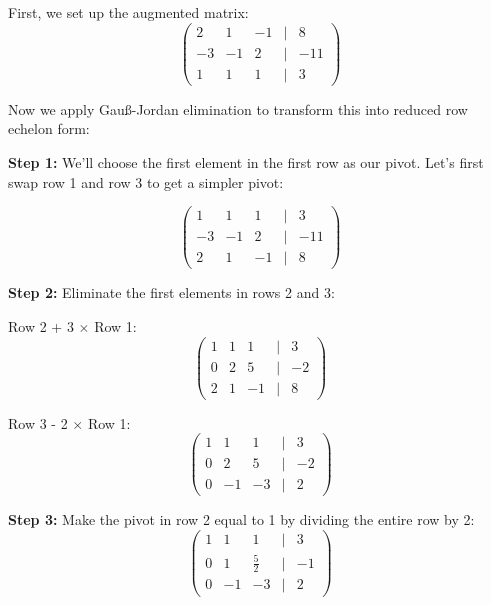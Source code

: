 First, we set up the augmented matrix:
\begin{equation*}
\begin{pmatrix}
2 & 1 & -1 & | & 8 \\
-3 & -1 & 2 & | & -11 \\
1 & 1 & 1 & | & 3
\end{pmatrix}
\end{equation*}

Now we apply Gauß-Jordan elimination to transform this into reduced row echelon form:

\textbf{Step 1:} We'll choose the first element in the first row as our pivot. Let's first swap row 1 and row 3 to get a simpler pivot:

\begin{equation*}
\begin{pmatrix}
1 & 1 & 1 & | & 3 \\
-3 & -1 & 2 & | & -11 \\
2 & 1 & -1 & | & 8
\end{pmatrix}
\end{equation*}

\textbf{Step 2:} Eliminate the first elements in rows 2 and 3:

Row 2 + 3 $\times$ Row 1:
\begin{equation*}
\begin{pmatrix}
1 & 1 & 1 & | & 3 \\
0 & 2 & 5 & | & -2 \\
2 & 1 & -1 & | & 8
\end{pmatrix}
\end{equation*}

Row 3 - 2 $\times$ Row 1:
\begin{equation*}
\begin{pmatrix}
1 & 1 & 1 & | & 3 \\
0 & 2 & 5 & | & -2 \\
0 & -1 & -3 & | & 2
\end{pmatrix}
\end{equation*}

\textbf{Step 3:} Make the pivot in row 2 equal to 1 by dividing the entire row by 2:
\begin{equation*}
\begin{pmatrix}
1 & 1 & 1 & | & 3 \\
0 & 1 & \frac{5}{2} & | & -1 \\
0 & -1 & -3 & | & 2
\end{pmatrix}
\end{equation*}

